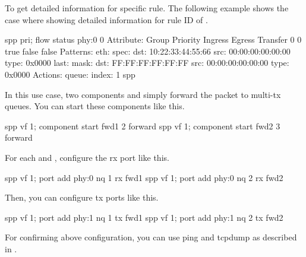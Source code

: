 \documentclass[a4paper,11pt,openany,oneside,english]{sphinxmanual}
\begin{document}
To get detailed information for specific rule. The following example shows
the case where showing detailed information for rule ID  of .

\begin{sphinxVerbatim}[commandchars=\\\{\},formatcom=\footnotesize]
spp \PYGZgt{} pri; flow status phy:0 0
Attribute:
  Group   Priority Ingress Egress Transfer
  0       0        true    false  false
Patterns:
  \PYGZhy{} eth:
    \PYGZhy{} spec:
      \PYGZhy{} dst: 10:22:33:44:55:66
      \PYGZhy{} src: 00:00:00:00:00:00
      \PYGZhy{} type: 0x0000
    \PYGZhy{} last:
    \PYGZhy{} mask:
      \PYGZhy{} dst: FF:FF:FF:FF:FF:FF
      \PYGZhy{} src: 00:00:00:00:00:00
      \PYGZhy{} type: 0x0000
Actions:
    \PYGZhy{} queue:
      \PYGZhy{} index: 1
spp \PYGZgt{}
\end{sphinxVerbatim}

In this use case, two components  and  simply forward
the packet to multi-tx queues. You can start these components like this.

\begin{sphinxVerbatim}[commandchars=\\\{\},formatcom=\footnotesize]
spp \PYGZgt{} vf 1; component start fwd1 2 forward
spp \PYGZgt{} vf 1; component start fwd2 3 forward
\end{sphinxVerbatim}

For each  and , configure the rx port like this.

\begin{sphinxVerbatim}[commandchars=\\\{\},formatcom=\footnotesize]
spp \PYGZgt{} vf 1; port add phy:0 nq 1 rx fwd1
spp \PYGZgt{} vf 1; port add phy:0 nq 2 rx fwd2
\end{sphinxVerbatim}

Then, you can configure tx ports like this.

\begin{sphinxVerbatim}[commandchars=\\\{\},formatcom=\footnotesize]
spp \PYGZgt{} vf 1; port add phy:1 nq 1 tx fwd1
spp \PYGZgt{} vf 1; port add phy:1 nq 2 tx fwd2
\end{sphinxVerbatim}

For confirming above configuration, you can use ping and tcpdump as described
in {\hyperref[\detokenize{usecases/spp_vf:spp-usecases-vf-cls-icmp}]{}}.
\end{document}
